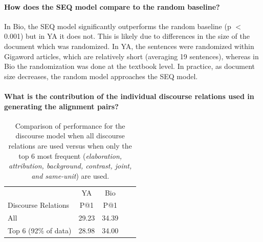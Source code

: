 
\paragraph{How does the SEQ model compare to the random baseline?}
In Bio, the SEQ model significantly outperforms the random baseline (p $<$ 0.001) but in YA it does not.  This is likely due to differences in the size of the document which was randomized.  In YA, the sentences were randomized within Gigaword articles, which are relatively short (averaging 19 sentences), whereas in Bio the randomization was done at the textbook level.  In practice, as document size decreases, the random model approaches the SEQ model.


\paragraph{What is the contribution of the individual discourse relations used in generating the alignment pairs?}

\begin{table}[t!]
\begin{center}
\begin{footnotesize}
\begin{tabular}{llclc}
\multicolumn{1}{l}{ } & \multicolumn{1}{c}{YA} & \multicolumn{1}{c}{Bio} 		\\
\multicolumn{1}{l}{ Discourse Relations } & \multicolumn{1}{c}{P@1} & \multicolumn{1}{c}{P@1}		\\
\cline{2-3}
\hline
All  	&  29.23	&	 34.39  \\
Top 6 (92\% of data)  	& 28.98		& 34.00 	\\
\end{tabular}
\end{footnotesize}
\caption{{Comparison of performance for the discourse model when all discourse relations are used versus when only the top 6 most frequent (\textit{elaboration, attribution, background, contrast, joint, and same-unit}) are used.}}
\label{tab:ablation}
\end{center}
\end{table}

